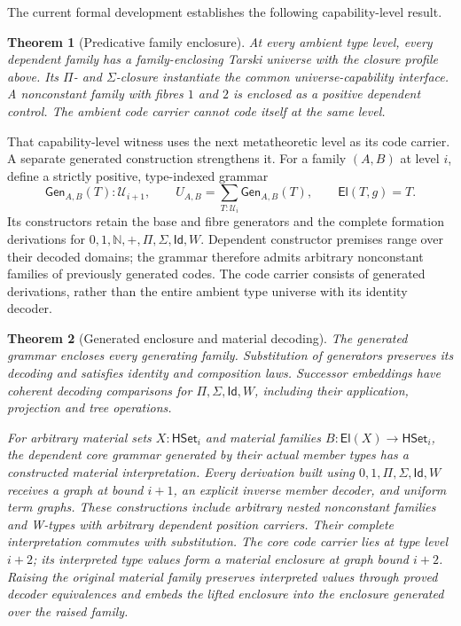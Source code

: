 \documentclass[11pt]{article}
\newtheorem{theorem}{Theorem}
\theoremstyle{definition}
\theoremstyle{remark}
\begin{document}
The current formal development establishes the following capability-level
result.

\begin{theorem}[Predicative family enclosure]
At every ambient type level, every dependent family has a family-enclosing
Tarski universe with the closure profile above.  Its $\Pi$- and $\Sigma$-closure
instantiate the common universe-capability interface.  A nonconstant family with
fibres $1$ and $2$ is enclosed as a positive dependent control.  The ambient
code carrier cannot code itself at the same level.
\end{theorem}

That capability-level witness uses the next metatheoretic level as its code
carrier.  A separate generated construction strengthens it.  For a family
$(A,B)$ at level $i$, define a strictly positive, type-indexed grammar
\[
  \mathsf{Gen}_{A,B}(T):\mathcal U_{i+1},
  \qquad
  U_{A,B}=\sum_{T:\mathcal U_i}\mathsf{Gen}_{A,B}(T),
  \qquad
  \mathsf{El}(T,g)=T.
\]
Its constructors retain the base and fibre generators and the complete
formation derivations for $0,1,\mathbb N,+,\Pi,\Sigma,\mathsf{Id},W$.
Dependent constructor premises range over their decoded domains; the grammar
therefore admits arbitrary nonconstant families of previously generated codes.
The code carrier consists of generated derivations, rather than the entire
ambient type universe with its identity decoder.

\begin{theorem}[Generated enclosure and material decoding]
The generated grammar encloses every generating family.  Substitution of
generators preserves its decoding and satisfies identity and composition laws.
Successor embeddings have coherent decoding comparisons for
$\Pi,\Sigma,\mathsf{Id},W$, including their application, projection and tree
operations.

For arbitrary material sets $X:\mathsf{HSet}_i$ and material families
$B:\mathsf{El}(X)\to\mathsf{HSet}_i$, the dependent core grammar generated by
their actual member types has a constructed material interpretation.  Every
derivation built using $0,1,\Pi,\Sigma,\mathsf{Id},W$ receives a graph at bound
$i+1$, an explicit inverse member decoder, and uniform term graphs.  These
constructions include arbitrary nested nonconstant families and W-types with
arbitrary dependent position carriers.  Their complete interpretation commutes
with substitution.  The core code carrier lies at type level $i+2$; its
interpreted type values form a material enclosure at graph bound $i+2$.
Raising the original material family preserves interpreted values through
proved decoder equivalences and embeds the lifted enclosure into the enclosure
generated over the raised family.
\end{theorem}
\end{document}

